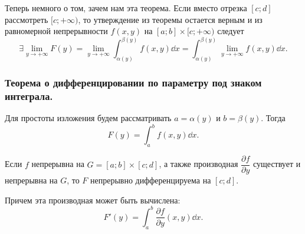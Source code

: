 Теперь немного о том, зачем нам эта теорема. Если вместо отрезка $[c; d]$ рассмотреть $[c; +\infty)$, то утверждение из теоремы остается верным и из равномерной непрерывности $f(x, y)$ на $[a; b] \times [c; +\infty)$ следует
\begin{equation*}
    \exists \lim_{y \to +\infty} F(y) = \lim_{y \to +\infty} \int_{\alpha(y)}^{\beta(y)} f(x, y) \dd x = \int_{\alpha(y)}^{\beta(y)} \lim_{y \to +\infty} f(x, y) \dd x.
\end{equation*}

\subsubsection{Теорема о дифференцировании по параметру под знаком интеграла.}

Для простоты изложения будем рассматривать $a = \alpha(y)$ и $b = \beta(y)$. Тогда
\begin{equation*}
    F(y) = \int_a^b f(x, y) \dd x.
\end{equation*}

\begin{theorem*}
    Если $f$ непрерывна на $G = [a; b] \times [c; d]$, а также производная $\dfrac{\partial f}{\partial y}$ существует и непрерывна на $G$, то $F$ непрерывно дифференцируема на $[c; d]$.

    Причем эта производная может быть вычислена:
    \begin{equation*}
        F'(y) = \int_a^b \dfrac{\partial f}{\partial y} (x, y) \dd x.
    \end{equation*}
\end{theorem*}

